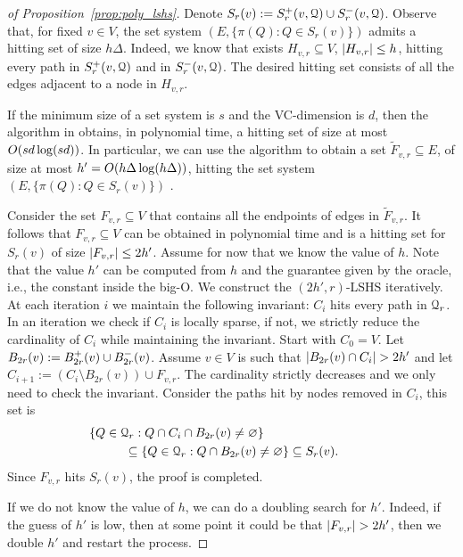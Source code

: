 \begin{proof}[of Proposition~\ref{prop:poly_lshs}]
Denote $S_r(v):=S^+_r(v,\mathcal{Q})\cup S^-_r(v,\mathcal{Q})$. 
Observe that, for fixed $v\in V$, the set system $(E,\{\pi(Q):Q \in S_r(v)\})$ admits a hitting set of size $h\Delta$.
Indeed, we know that exists $H_{v,r}\subseteq V$, $\lvert H_{v,r}\rvert\leq h$, hitting every path in $S^+_r(v,\mathcal{Q})$ and in $S^-_r(v,\mathcal{Q})$.
The desired hitting set consists of all the edges adjacent to a node in $H_{v,r}$.

If the minimum size of a set system is $s$ and the VC-dimension is $d$, then the algorithm in \cite{vc_dim_hitting} obtains, in polynomial time, a hitting set of size at most $O(sd\log(sd))$.
In particular, we can use the algorithm to obtain a set $\tilde F_{v,r}\subseteq E$, of size at most $h'=O(h\Delta\log(h\Delta))$, hitting the set system $(E,\{\pi(Q):Q \in S_r(v)\})$ .

Consider the set $F_{v,r}\subseteq V$ that contains all the endpoints of edges in $\tilde F_{v,r}$.
It follows that $F_{v,r}\subseteq V$ can be obtained in polynomial time and is a hitting set for $S_r(v)$ of size $\lvert F_{v,r}\rvert\leq 2h'$.
Assume for now that we know the value of $h$.
Note that the value $h'$ can be computed from $h$ and the guarantee given by the oracle, i.e., the constant inside the big-O.
We construct the $(2h',r)$-LSHS iteratively.
At each iteration $i$ we maintain the following invariant: $C_i$ hits every path in $\mathcal{Q}_r$.
In an iteration we check if $C_i$ is locally sparse, if not, we strictly reduce the cardinality of $C_i$ while maintaining the invariant.
Start with $C_0=V$. 
Let $B_{2r}(v):=B^+_{2r}(v)\cup B^-_{2r}(v)$.
Assume $v\in V$ is such that $\lvert B_{2r}(v)\cap C_i\rvert>2h'$ and let $C_{i+1}:=(C_i\setminus B_{2r}(v))\cup F_{v,r} $.
The cardinality strictly decreases and we only need to check the invariant.
Consider the paths hit by nodes removed in $C_i$, this set is
\begin{align*}
&\hspace{-1cm}\{Q\in\calQ_r: Q\cap C_i\cap B_{2r}(v)\neq \varnothing\}\\
&\subseteq \{Q\in\calQ_r: Q\cap B_{2r}(v)\neq \varnothing\} \subseteq S_r(v).
\end{align*}
Since $F_{v,r}$ hits $S_r(v)$, the proof is completed.

If we do not know the value of $h$, we can do a doubling search for $h'$. 
Indeed, if the guess of $h'$ is low, then at some point it could be that $\lvert F_{v,r}\rvert>2h'$, then we double $h'$ and restart the process.
\end{proof}


